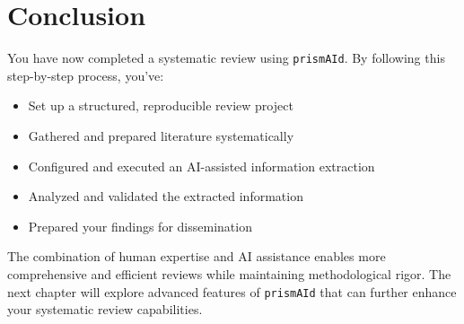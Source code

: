 
\section{Conclusion}

You have now completed a systematic review using \texttt{prismAId}. By following this step-by-step process, you've:

\begin{itemize}
    \item Set up a structured, reproducible review project
    \item Gathered and prepared literature systematically
    \item Configured and executed an AI-assisted information extraction
    \item Analyzed and validated the extracted information
    \item Prepared your findings for dissemination
\end{itemize}


The combination of human expertise and AI assistance enables more comprehensive and efficient reviews while maintaining methodological rigor. The next chapter will explore advanced features of \texttt{prismAId} that can further enhance your systematic review capabilities.
